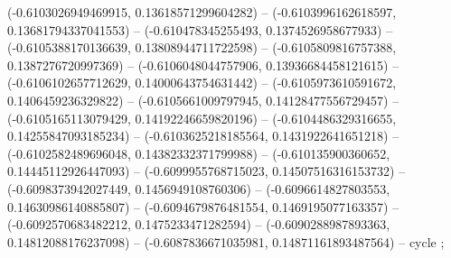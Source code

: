 (-0.6103026949469915, 0.13618571299604282) -- (-0.6103996162618597, 0.13681794337041553) -- (-0.610478345255493, 0.1374526958677933) -- (-0.6105388170136639, 0.13808944711722598) -- (-0.6105809816757388, 0.1387276720997369) -- (-0.6106048044757906, 0.13936684458121615) -- (-0.6106102657712629, 0.14000643754631442) -- (-0.6105973610591672, 0.1406459236329822) -- (-0.6105661009797945, 0.14128477556729457) -- (-0.6105165113079429, 0.14192246659820196) -- (-0.6104486329316655, 0.14255847093185234) -- (-0.6103625218185564, 0.1431922641651218) -- (-0.6102582489696048, 0.14382332371799988) -- (-0.610135900360652, 0.14445112926447093) -- (-0.6099955768715023, 0.14507516316153732) -- (-0.6098373942027449, 0.1456949108760306) -- (-0.6096614827803553, 0.14630986140885807) -- (-0.6094679876481554, 0.1469195077163357) -- (-0.6092570683482212, 0.1475233471282594) -- (-0.6090288987893363, 0.14812088176237098) -- (-0.6087836671035981, 0.14871161893487564) -- cycle
;